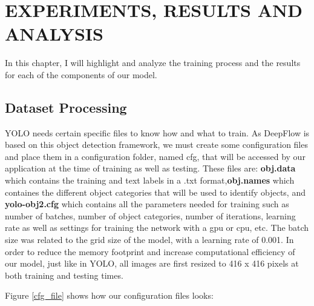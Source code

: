 %
%
%


\chapter{\uppercase{Experiments, Results and Analysis}}

In this chapter, I will highlight and analyze the training process and the results for each of the components of our model. 

\section{Dataset Processing}

YOLO needs certain specific files to know how and what to train. As DeepFlow is based on this object detection framework, we must create some configuration files and place them in a configuration folder, named cfg, that will be accessed by our application at the time of training as well as testing. These files are: \textbf{obj.data} which contains the training and text labels in a .txt format,\textbf{obj.names} which containes the different object categories that will be used to identify objects, and \textbf{yolo-obj2.cfg} which contains all the parameters needed for training such as number of batches, number of object categories, number of iterations, learning rate as well as settings for training the network with a gpu or cpu, etc.  The batch size was related to the grid size of the model, with a learning rate of 0.001. In order to reduce the memory footprint and increase computational efficiency of our model, just like in YOLO, all images are first resized to 416 x 416 pixels at both training and testing times. 

\vspace{15mm}
\newpage
Figure \ref{cfg_file} shows how our configuration files looks:

